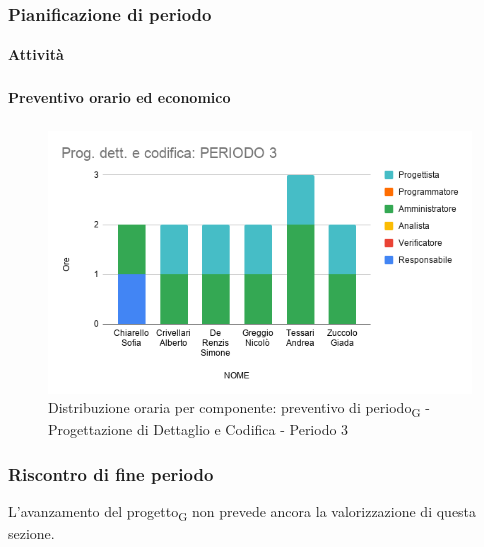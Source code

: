 \subsubsection{Pianificazione di periodo}


\paragraph{Attività}
\subparagraph*{}

\planningTable{
	
}



\paragraph{Preventivo orario ed economico}
\subparagraph*{}

\contabilitaTable{
	
}

\begin{figure}[H]
	\centering
	\includegraphics[scale=0.6]{res/images/charts/preventivo/prog_dett_3.png}
	\caption{Distribuzione oraria per componente: preventivo di periodo\textsubscript{G} - Progettazione di Dettaglio e Codifica - Periodo 3}
\end{figure}



\subsubsection{Riscontro di fine periodo}


L'avanzamento del progetto\textsubscript{G} non prevede ancora la valorizzazione di questa sezione.

